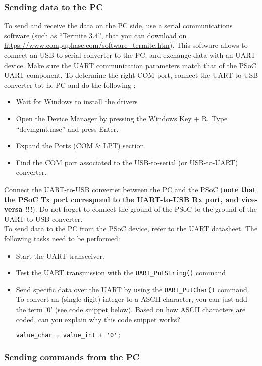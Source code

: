 \subsubsection{Sending data to the PC}
To send and receive the data on the PC side, use a serial communications software (such as ``Termite 3.4'', that you can download on \url{https://www.compuphase.com/software_termite.htm}). This software allows to connect an USB-to-serial converter to the PC, and exchange data with an UART device. Make sure the UART communication parameters match that of the PSoC UART component. To determine the right COM port, connect the UART-to-USB converter tot he PC and do the following : 
\begin{itemize}
\item Wait for Windows to install the drivers
\item Open the Device Manager by pressing the Windows Key $+$ R. Type “devmgmt.msc” and press Enter.
\item Expand the Ports (COM \& LPT) section.
\item Find the COM port associated to the USB-to-serial (or USB-to-UART) converter. 
\end{itemize}
Connect the UART-to-USB converter between the PC and the PSoC (\textbf{note that the PSoC Tx port correspond to the UART-to-USB Rx port, and vice-versa !!!}). Do not forget to connect the ground of the PSoC to the ground of the UART-to-USB converter. 
\\
To send data to the PC from the PSoC device, refer to the UART datasheet. The following tasks need to be performed: 
\begin{itemize}
	\item Start the UART transceiver. 
	\item Test the UART transmission with the \texttt{UART\_PutString()} command
	\item Send specific data over the UART by using the \texttt{UART\_PutChar()} command. To convert an (single-digit) integer to a ASCII character, you can just add the term '0' (see code snippet below). Based on how ASCII characters are coded, can you explain why this code snippet works? 
\begin{lstlisting}[style=customc]
value_char = value_int + '0'; 
\end{lstlisting}
\end{itemize}


\subsubsection{Sending commands from the PC}

